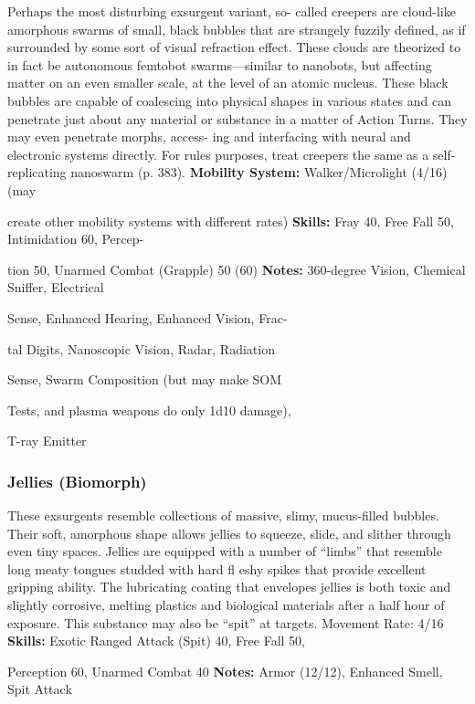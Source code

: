 Perhaps the most disturbing exsurgent variant, so-
called creepers are cloud-like amorphous swarms of 
small, black bubbles that are strangely fuzzily defined, 
as if surrounded by some sort of visual refraction effect. 
These clouds are theorized to in fact be autonomous 
femtobot swarms—similar to nanobots, but affecting 
matter on an even smaller scale, at the level of an atomic 
nucleus. These black bubbles are capable of coalescing 
into physical shapes in various states and can penetrate 
just about any material or substance in a matter of 
Action Turns. They may even penetrate morphs, access-
ing and interfacing with neural and electronic systems 
directly. For rules purposes, treat creepers the same as a 
self-replicating nanoswarm (p. 383).
\textbf{Mobility System: }Walker/Microlight (4/16) (may 

create other mobility systems with different rates)
\textbf{Skills:} Fray 40, Free Fall 50, Intimidation 60, Percep-

tion 50, Unarmed Combat (Grapple) 50 (60) 
\textbf{Notes: }360-degree Vision, Chemical Sniffer, Electrical 

Sense, Enhanced Hearing, Enhanced Vision, Frac-

tal Digits, Nanoscopic Vision, Radar, Radiation 

Sense, Swarm Composition (but may make SOM 

Tests, and plasma weapons do only 1d10 damage), 

T-ray Emitter

\subsubsection{Jellies (Biomorph)}

These exsurgents resemble collections of massive, slimy, 
mucus-filled bubbles. Their soft, amorphous shape 
allows jellies to squeeze, slide, and slither through 
even tiny spaces. Jellies are equipped with a number 
of ``limbs'' that resemble long meaty tongues studded 
with hard fl eshy spikes that provide excellent gripping 
ability. The lubricating coating that envelopes jellies is 
both toxic and slightly corrosive, melting plastics and 
biological materials after a half hour of exposure. This 
substance may also be ``spit'' at targets.
\textbf{ }
Movement Rate: 4/16
\textbf{Skills:} Exotic Ranged Attack (Spit) 40, Free Fall 50, 

Perception 60, Unarmed Combat 40
\textbf{Notes:} Armor (12/12), Enhanced Smell, Spit Attack 

